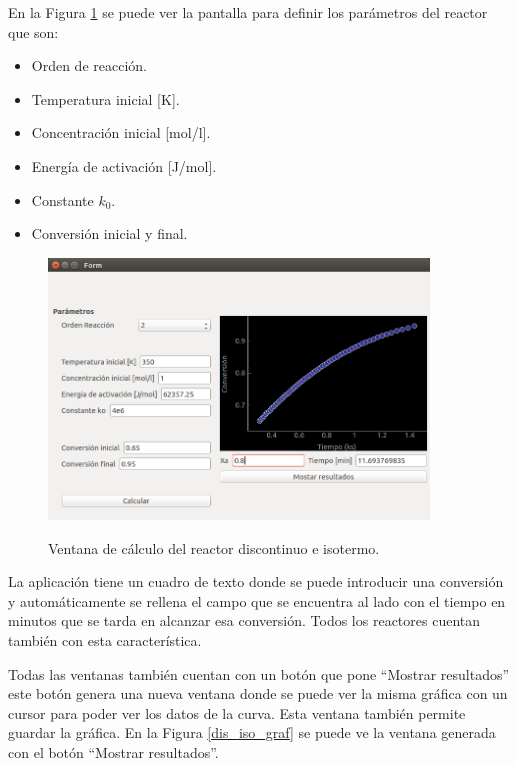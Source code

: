 	En la Figura \ref{dis_iso} se puede ver la pantalla para definir los parámetros del reactor que son: 
	\begin{itemize}
		\item Orden de reacción.
		\item Temperatura inicial [K].
		\item Concentración inicial [mol/l].
		\item Energía de activación [J/mol].
		\item Constante $k_0$.
		\item Conversión inicial y final.
	\end{itemize}
	\begin{figure}[!h]
		\centering
		\includegraphics[width=0.9\textwidth]{./imagenes/reactor_discontinuo/Form_048.png}
		\label{dis_iso}
		\caption{Ventana de cálculo del reactor discontinuo e isotermo.}
	\end{figure}

	La aplicación tiene un cuadro de texto donde se puede introducir una conversión y automáticamente se rellena el campo que se encuentra al lado con el tiempo en  minutos que se tarda en alcanzar esa conversión. Todos los reactores cuentan también con esta característica.
	
	Todas las ventanas también cuentan con un botón que pone ``Mostrar resultados'' este botón genera una nueva ventana donde se puede ver la misma gráfica con un cursor para poder ver los datos de la curva. Esta ventana también permite guardar la gráfica. En la Figura \ref{dis_iso_graf} se puede ve la ventana generada con el botón ``Mostrar resultados''.
	
